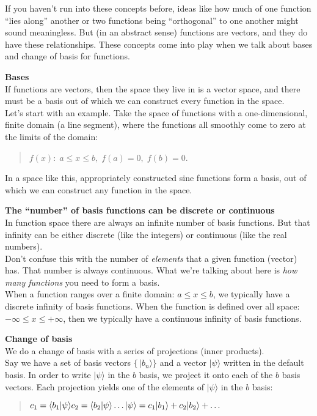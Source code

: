 \documentclass{article}
\def\ket#1{|#1\rangle}
\def\braket#1#2{\langle#1|#2\rangle}
\newcommand{\head}[1]{ \vspace{12pt} {\bf #1} \vspace{-12pt}\\ }
\def\p{ \vspace{10pt}\\ }
\begin{document}
If you haven't run into these concepts before, ideas like how much of one
function ``lies along'' another or two functions being ``orthogonal'' to
one another might sound meaningless. But (in an abstract sense) functions
are vectors, and they do have these relationships. These concepts come
into play when we talk about bases and change of basis for functions.

\head{Bases}

If functions are vectors, then the space they live in is a vector space,
and there must be a basis out of which we can construct every function
in the space. 
\p
Let's start with an example. Take the space of functions with a
one-dimensional, finite domain (a line segment), where the functions all
smoothly come to zero at the limits of the domain: 
\begin{quote}
$f(x):\; a \leq x \leq b, \; f(a)=0, \; f(b)=0$.
\end{quote}

In a space like this, appropriately constructed sine functions form a
basis, out of which we can construct any function in the space.
{\color{red}{\it See the ...}}

\pagebreak

\head{The ``number'' of basis functions can be discrete or continuous}

In function space there are always an infinite number of basis functions.
But that infinity can be either discrete (like the integers) or
continuous (like the real numbers). 
\p
Don't confuse this with the number of {\it elements} that a given function
(vector) has. That number is always continuous. What we're talking
about here is {\it how many functions} you need to form a basis.
\p
When a function ranges over a finite domain: $a \leq x \leq b$,
we typically
have a discrete infinity of basis functions. When the function is 
defined over all space: $-\infty \leq x \leq +\infty$, then we typically
have a continuous infinity of basis functions.

\head{Change of basis}

We do a change of basis with a series of projections (inner products).
\p
Say we have a set of basis vectors $\{\,\ket{b_n}\}$ and a vector $\ket{\psi}$
written in the default basis. In order to write $\ket{\psi}$ in the
$b$ basis, we project it onto each of the $b$ basis vectors. Each projection
yields one of the elements of $\ket{\psi}$ in the $b$ basis:

\begin{quote}
$
c_1 = \braket{b_1}{\psi}\\
c_2 = \braket{b_2}{\psi}\\
\ldots\\
\ket{\psi} = c_1 \ket{b_1} + c_2 \ket{b_2} + \ldots
$
\end{quote}
\end{document}
